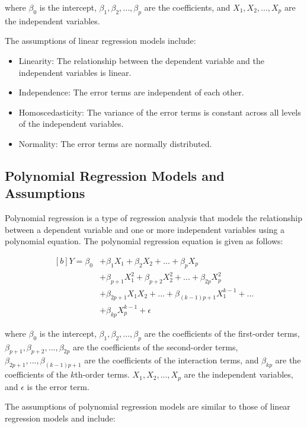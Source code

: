\documentclass{article}
\begin{document}
where $\beta_0$ is the intercept, $\beta_1, \beta_2, ..., \beta_p$ are the coefficients, and $X_1, X_2, ..., X_p$ are the independent variables.

The assumptions of linear regression models include:

\begin{itemize}
\item Linearity: The relationship between the dependent variable and the independent variables is linear.
\item Independence: The error terms are independent of each other.
\item Homoscedasticity: The variance of the error terms is constant across all levels of the independent variables.
\item Normality: The error terms are normally distributed.
\end{itemize}

\subsection{Polynomial Regression Models and Assumptions}
Polynomial regression is a type of regression analysis that models the relationship between a dependent variable and one or more independent variables using a polynomial equation. The polynomial regression equation is given as follows:

\begin{equation}
    \begin{aligned}[b]
    Y = \beta_0 &+ \beta_1X_1 + \beta_2X_2 + ... + \beta_pX_p \\
    &+ \beta_{p+1}X_1^2 + \beta_{p+2}X_2^2 + ... + \beta_{2p}X_p^2 \\
    &+ \beta_{2p+1}X_1X_2 + ... + \beta_{(k-1)p+1}X_1^{k-1} + ... \\
    &+ \beta_{kp}X_p^{k-1} + \epsilon
    \end{aligned}
    \end{equation}
    

where $\beta_0$ is the intercept, $\beta_1, \beta_2, ..., \beta_p$ are the coefficients of the first-order terms, $\beta_{p+1}, \beta_{p+2}, ..., \beta_{2p}$ are the coefficients of the second-order terms, $\beta_{2p+1}, ..., \beta_{(k-1)p+1}$ are the coefficients of the interaction terms, and $\beta_{kp}$ are the coefficients of the $k$th-order terms. $X_1, X_2, ..., X_p$ are the independent variables, and $\epsilon$ is the error term.

The assumptions of polynomial regression models are similar to those of linear regression models and include:
\end{document}
